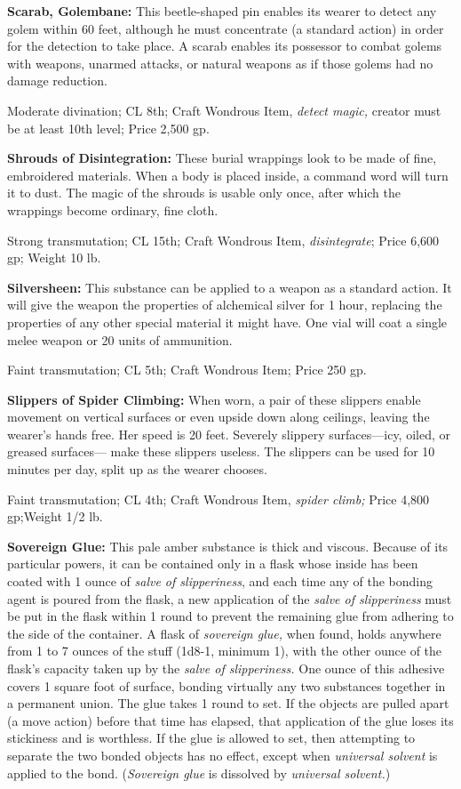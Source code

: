 \textbf{Scarab, Golembane:} This beetle-shaped pin enables its wearer to detect 
any golem within 60 feet, although he must concentrate (a standard action) in order 
for the detection to take place. A scarab enables its possessor to combat golems 
with weapons, unarmed attacks, or natural weapons as if those golems had no damage 
reduction.

Moderate divination; CL 8th; Craft Wondrous Item, \textit{detect magic, }creator 
must be at least 10th level; Price 2,500 gp.

\textbf{Shrouds of Disintegration:} These burial wrappings look to be made of fine, 
embroidered materials. When a body is placed inside, a command word will turn it 
to dust. The magic of the shrouds is usable only once, after which the wrappings 
become ordinary, fine cloth.

Strong transmutation; CL 15th; Craft Wondrous Item, \textit{disintegrate}; Price 
6,600 gp; Weight 10 lb.

\textbf{Silversheen:} This substance can be applied to a weapon as a standard action. 
It will give the weapon the properties of alchemical silver for 1 hour, replacing 
the properties of any other special material it might have. One vial will coat 
a single melee weapon or 20 units of ammunition.

Faint transmutation; CL 5th; Craft Wondrous Item; Price 250 gp.

\textbf{Slippers of Spider Climbing:} When worn, a pair of these slippers enable 
movement on vertical surfaces or even upside down along ceilings, leaving the wearer's 
hands free. Her speed is 20 feet. Severely slippery surfaces---icy, oiled, or greased 
surfaces--- make these slippers useless. The slippers can be used for 10 minutes 
per day, split up as the wearer chooses.

Faint transmutation; CL 4th; Craft Wondrous Item, \textit{spider climb; }Price 
4,800 gp;Weight 1/2 lb.

\textbf{Sovereign Glue:} This pale amber substance is thick and viscous. Because 
of its particular powers, it can be contained only in a flask whose inside has 
been coated with 1 ounce of \textit{salve of slipperiness}, and each time any of 
the bonding agent is poured from the flask, a new application of the \textit{salve 
of slipperiness }must be put in the flask within 1 round to prevent the remaining 
glue from adhering to the side of the container. A flask of \textit{sovereign glue, 
}when found, holds anywhere from 1 to 7 ounces of the stuff (1d8-1, minimum 1), 
with the other ounce of the flask's capacity taken up by the \textit{salve of slipperiness. 
}One ounce of this adhesive covers 1 square foot of surface, bonding virtually 
any two substances together in a permanent union. The glue takes 1 round to set. 
If the objects are pulled apart (a move action) before that time has elapsed, that 
application of the glue loses its stickiness and is worthless. If the glue is allowed 
to set, then attempting to separate the two bonded objects has no effect, except 
when \textit{universal solvent }is applied to the bond. (\textit{Sovereign glue 
}is dissolved by \textit{universal solvent.})

